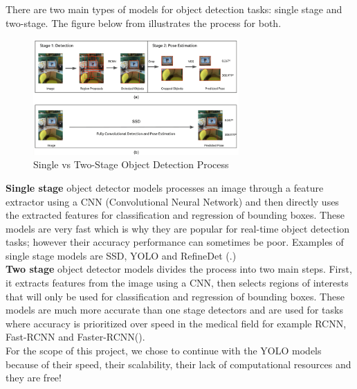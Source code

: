 There are two main types of models for object detection tasks: single stage and two-stage. The figure below from \cite{singlevstwodetectorimg} illustrates the process for both.
\begin{figure}[h!]
  \centering
  \includegraphics[width=0.7\textwidth]{images/single-vs-two-stage-obj-detector.png}
  \caption{Single vs Two-Stage Object Detection Process}
\end{figure}
\textbf{Single stage} object detector models processes an image through a feature extractor using a CNN (Convolutional Neural Network) and then directly uses the extracted features for classification and regression of bounding boxes. These models are very fast which is why they are popular for real-time object detection tasks; however their accuracy performance can sometimes be poor. Examples of single stage models are SSD, YOLO and RefineDet (\cite{yoloversionsliterature}.)\\
\textbf{Two stage} object detector models divides the process into two main steps. First, it extracts features from the image using a CNN, then selects regions of interests that will only be used for classification and regression of bounding boxes. These models are much more accurate than one stage detectors and are used for tasks where accuracy is prioritized over speed in the medical field for example RCNN, Fast-RCNN and Faster-RCNN(\cite{singlevstwostagedetectors}).\\

For the scope of this project, we chose to continue with the YOLO models because of their speed, their scalability, their lack of computational resources and they are free!\\


